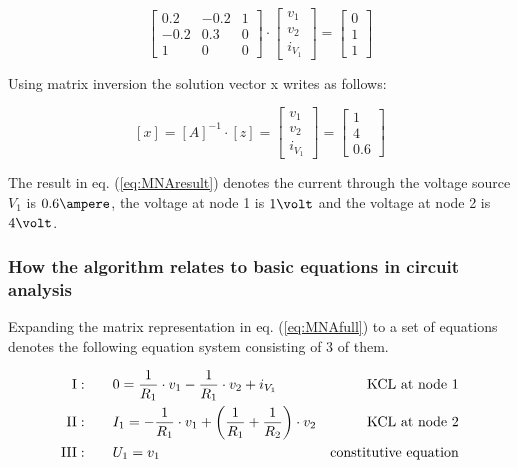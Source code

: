 \documentclass[10pt]{report}
\begin{document}
\begin{equation}
\begin{bmatrix}
0.2 & -0.2 & 1\\
-0.2 & 0.3 & 0\\
1 & 0 & 0
\end{bmatrix}
\cdot
\begin{bmatrix}
v_{1}\\
v_{2}\\
i_{V_{1}}
\end{bmatrix}
=
\begin{bmatrix}
0\\
1\\
1
\end{bmatrix}
\end{equation}

Using matrix inversion the solution vector x writes as follows:

\begin{equation}
\left[x\right] = 
\left[A\right]^{-1}\cdot \left[z\right] = 
\begin{bmatrix}
v_{1}\\
v_{2}\\
i_{V_{1}}
\end{bmatrix}
=
\begin{bmatrix}
1\\
4\\
0.6
\end{bmatrix}
\label{eq:MNAresult}
\end{equation}

The result in eq. (\ref{eq:MNAresult}) denotes the current through the
voltage source $V_{1}$ is $0.6\ampere$, the voltage at node 1 is
$1\volt$ and the voltage at node 2 is $4\volt$.

\subsubsection{How the algorithm relates to basic equations in circuit analysis}

Expanding the matrix representation in eq. (\ref{eq:MNAfull}) to a set
of equations denotes the following equation system consisting of 3 of
them.

\begin{align}
\rm{I:}& \qquad 0 = \frac{1}{R_{1}}\cdot v_{1} - \frac{1}{R_{1}}\cdot v_{2} + i_{V_{1}}& \text{KCL at node 1}\\
\rm{II:}& \qquad I_{1} = -\frac{1}{R_{1}}\cdot v_{1} + \left(\frac{1}{R_{1}} + \frac{1}{R_{2}}\right)\cdot v_{2}& \text{KCL at node 2}\\
\rm{III:}& \qquad U_{1} = v_{1}& \text{constitutive equation}
\end{align}
\end{document}
